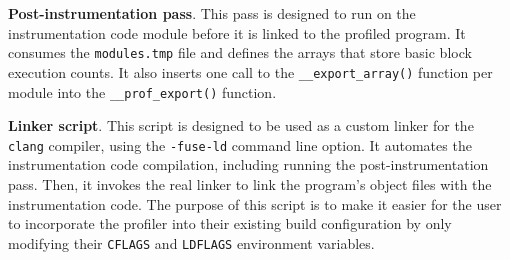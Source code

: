 \medskip
\noindent
\textbf{Post-instrumentation pass}. This pass is designed to run on the instrumentation code module before it is linked to the profiled program. It consumes the \texttt{modules.tmp} file and defines the arrays that store basic block execution counts. It also inserts one call to the \texttt{\_\_export\_array()} function per module into the \texttt{\_\_prof\_export()} function.

\medskip
\noindent
\textbf{Linker script}. This script is designed to be used as a custom linker for the \texttt{clang} compiler, using the \texttt{-fuse-ld} command line option.  It automates the instrumentation code compilation, including running the post-instrumentation pass. Then, it invokes the real linker to link the program's object files with the instrumentation code. The purpose of this script is to make it easier for the user to incorporate the profiler into their existing build configuration by only modifying their \texttt{CFLAGS} and \texttt{LDFLAGS} environment variables.





